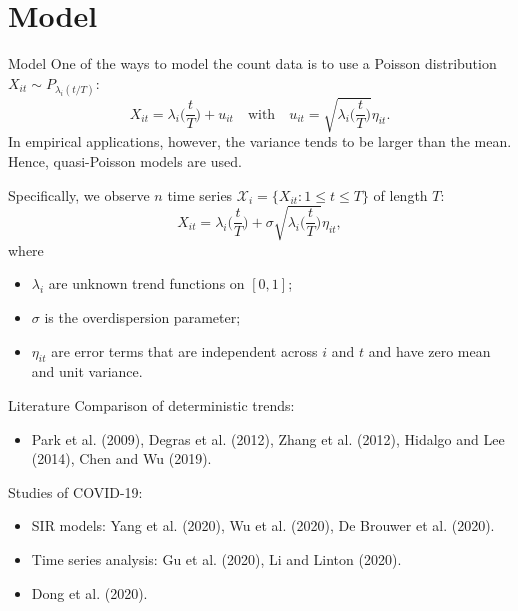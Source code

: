 \documentclass[10pt]{beamer}
\begin{document}
\section{Model}
\begin{frame}{Model}
One of the ways to model the count data is to use a Poisson distribution $X_{it} \sim P_{\lambda_i(t/T)}$:
\vspace{-2mm}
\begin{equation}\label{eq:model-Poisson}
X_{it} = \lambda_i\Big(\frac{t}{T}\Big) + u_{it} \quad \text{with} \quad u_{it} = \sqrt{\lambda_i\Big(\frac{t}{T}\Big)} \eta_{it}.
\end{equation}\pause
In empirical applications, however, the variance tends to be larger than the mean. Hence, quasi-Poisson models are used.

Specifically, we observe $n$ time series $\mathcal{X}_i = \{X_{it}: 1 \le t \le T \}$ of length $T$:
\begin{equation*}
X_{it} = \lambda_i \Big( \frac{t}{T} \Big) + \sigma\sqrt{\lambda_i \Big( \frac{t}{T} \Big)} \eta_{it},
\end{equation*}\pause
\vspace{-3mm}
where
\begin{itemize}
\item $\lambda_i$ are unknown trend functions on $[0,1]$;
\item $\sigma$ is the overdispersion parameter;
\item $\eta_{it}$ are error terms that are independent across $i$ and $t$ and have zero mean and unit variance.
\end{itemize}
\end{frame}

\begin{frame}{Literature}
	Comparison of deterministic trends:
	\begin{itemize}
		\item Park et al. (2009), Degras et al. (2012), Zhang et al. (2012), Hidalgo and Lee (2014), Chen and Wu (2019).
	\end{itemize}\pause
	Studies of COVID-19:
	\begin{itemize}
		\item SIR models: Yang et al. (2020), Wu et al. (2020), De Brouwer et al. (2020).
		\item Time series analysis: Gu et al. (2020), Li and Linton (2020).
		\item Dong et al. (2020).
	\end{itemize}
\end{frame}
\end{document}
